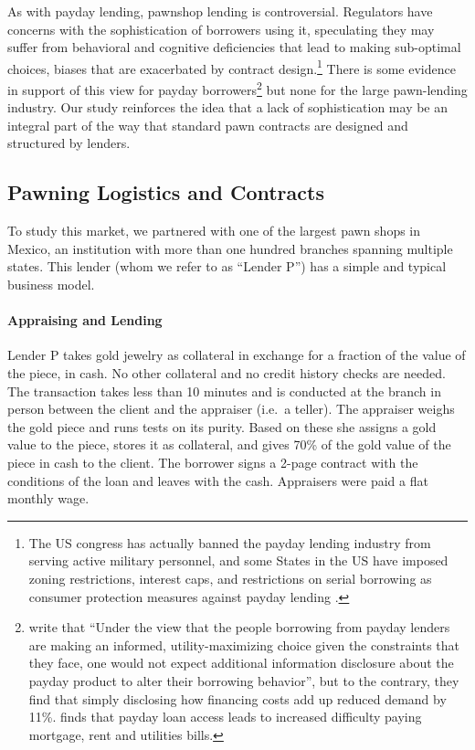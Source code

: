 \documentclass[12pt, a4paper, colorinlistoftodos]{article}
\begin{document}
As with payday lending, pawnshop lending is controversial. Regulators have concerns with the sophistication of borrowers using it, speculating they may suffer from behavioral and cognitive deficiencies that lead to making sub-optimal choices, biases that are exacerbated by contract design.\footnote{The US congress has actually banned the payday lending industry from serving active military personnel, and some States in the US have imposed zoning restrictions, interest caps, and restrictions on serial borrowing as consumer protection measures against payday lending \citep{Payday}.} There is some evidence in support of this view for payday borrowers\footnote{\cite{Bertrand} write that ``Under the view that the people borrowing from payday lenders are making an informed, utility-maximizing choice given the constraints that they face, one would not expect additional information disclosure about the payday product to alter their borrowing behavior'', but to the contrary, they find that simply disclosing how financing costs add up reduced demand by 11\%. \cite{Meltzer} finds that payday loan access leads to increased difficulty paying mortgage, rent and utilities bills.} but none for the large pawn-lending industry. Our study reinforces the idea that a lack of sophistication may be an integral part of the way that standard pawn contracts are designed and structured by lenders.



\subsection{Pawning Logistics and Contracts}

To study this market, we partnered with one of the largest pawn shops in Mexico, an institution with more than one hundred branches spanning multiple states. This lender (whom we refer to as ``Lender P'') has a simple and typical business model. 

\paragraph*{Appraising and Lending} Lender P takes gold jewelry as collateral in exchange for a fraction of the value of the piece, in cash. No other collateral and no credit history checks are needed. The transaction takes less than 10 minutes and is conducted at the branch in person between the client and the appraiser (i.e.\ a teller).
The appraiser weighs the gold piece and runs tests on its purity. Based on these she assigns a gold value to the piece, stores it as collateral, and gives 70\% of the gold value of the piece in cash to the client. The borrower signs a 2-page contract with the conditions of the loan and leaves with the cash. Appraisers were paid a flat monthly wage.
\end{document}
